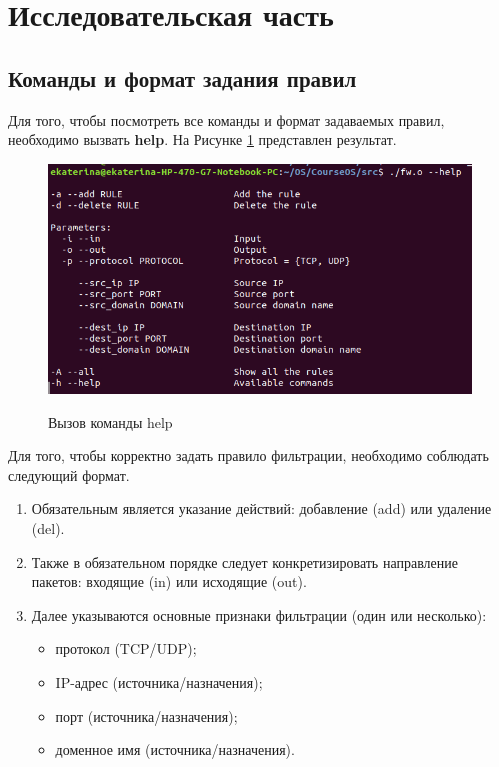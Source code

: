 \section{Исследовательская часть}

\subsection{Команды и формат задания правил}
Для того, чтобы посмотреть все команды и формат задаваемых правил, необходимо вызвать \textbf{help}. На Рисунке \ref{fig11:image} представлен результат.

\begin{figure}[h]
	\begin{center}
		{\includegraphics[scale = 0.6]{img/screenshots/help/help.png}}
		\caption{Вызов команды help}
		\label{fig11:image}
	\end{center}
\end{figure}
Для того, чтобы корректно задать правило фильтрации, необходимо соблюдать следующий формат.
\begin{enumerate}
	\item Обязательным является указание действий: добавление (add) или удаление (del).
	
	\item Также в обязательном порядке следует конкретизировать направление пакетов: входящие (in) или исходящие (out).
	
	\item Далее указываются основные признаки фильтрации (один или несколько):
	\begin{itemize}
		\item протокол (TCP/UDP);
		
		\item IP-адрес (источника/назначения);
		
		\item порт (источника/назначения);
		
		\item доменное имя (источника/назначения). \newline
	\end{itemize}
	
\end{enumerate}


